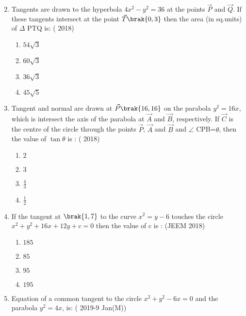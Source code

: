 \begin{enumerate}
\begin{multicols}{2}
\begin{enumerate}
	\end{enumerate}
\end{multicols}
\item Tangents are drawn to the hyperbola $4x^2-y^2=36$ at the points $\vec{P}$ and $\vec{Q}$. If  these tangents intersect  at the point $\vec{T}\brak{0,3}$ then the area (in sq.units) of $\Delta$ PTQ is:
     \hfill{( 2018)}
	\begin{multicols}{2}
\begin{enumerate}
     		\item $54\sqrt3$
     		\item $60\sqrt3$
     		\item $36\sqrt3$ 
     		\item $45\sqrt5$
	\end{enumerate}
\end{multicols}
\item Tangent and normal are drawn at $\vec{P}\brak{16,16}$ on the parabola $y^2=16x$,
which is intersect the axis of the parabola at $\vec{A}$ and $\vec{B}$, respectively. If $\vec{C}$ is the centre of the circle through the points $\vec{P}$, $\vec{A}$ and $\vec{B}$ and $\angle$ CPB=$\theta$, then the value of $\tan{\theta}$ is :
     \hfill{( 2018)}
	\begin{multicols}{2}
\begin{enumerate}
    		\item $2$
    		\item $3$
    		\item $\frac{4}{3}$
    		\item $\frac{1}{2}$
	\end{enumerate}
\end{multicols}
\item If the tangent at $\brak{1,7}$ to the curve $x^2=y-6$ touches the circle $x^2+y^2+16x+12y+c=0$ then the value of c is :
       \hfill{(JEEM 2018)}
	\begin{multicols}{2}
\begin{enumerate}
    		\item $185$
    		\item $85$
    		\item $95$
    		\item $195$
	\end{enumerate}
\end{multicols} 
\item Equation of a common tangent to the circle $x^2+y^2-6x=0$ and the parabola $y^2=4x$, is:
     \hfill{(  2019-9 Jan(M))}
	\begin{multicols}{2}

\end{multicols}
\end{enumerate}
